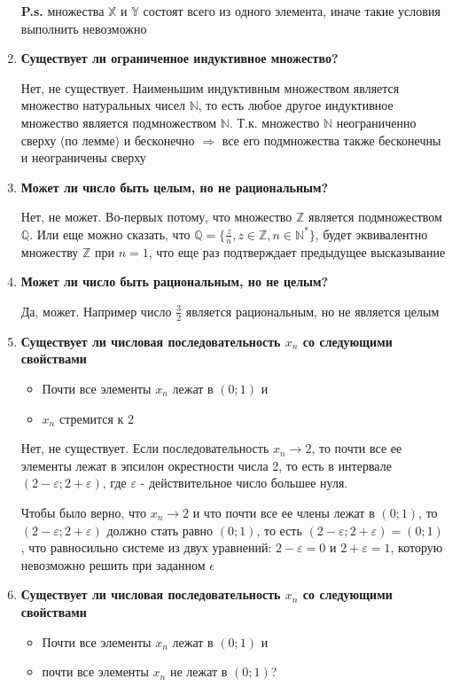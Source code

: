 \documentclass[a4paper,12pt]{article}
\begin{document}
\begin{enumerate}
{        \textbf{P.s.} множества $\mathbb{X}$ и $\mathbb{Y}$ состоят всего из одного элемента, иначе такие
        условия выполнить невозможно
    }
    \item {
      \textbf{Существует ли ограниченное индуктивное множество?}

      Нет, не существует. Наименьшим индуктивным множеством является множество натуральных чисел $\mathbb{N}$,
      то есть любое другое индуктивное множество является подмножеством $\mathbb{N}$. Т.к. множество $\mathbb{N}$
      неограниченно сверху (по лемме) и бесконечно $\Rightarrow$ все его подмножества также бесконечны и неограничены сверху
    }
    \item {
      \textbf{Может ли число быть целым, но не рациональным?}

      Нет, не может. Во-первых потому, что множество $\mathbb{Z}$ является подмножеством $\mathbb{Q}$.
      Или еще можно сказать, что $\mathbb{Q} = \{\frac{z}{n}, z \in \mathbb{Z}, n \in \mathbb{N}^{*}\}$,
      будет эквивалентно множеству $\mathbb{Z}$ при $n = 1$, что еще раз подтверждает предыдущее высказывание
    }
    \item {
      \textbf{Может ли число быть рациональным, но не целым?}

      Да, может. Например число $\frac{3}{2}$ является рациональным, но не является целым
    }
    \item {
      \textbf{Существует ли числовая последовательность $x_n$ со следующими свойствами}
      \begin{itemize}
        \item Почти все элементы $x_n$ лежат  в $(0; 1)$ и
        \item $x_n$ стремится к 2
      \end{itemize}

      Нет, не существует. Если последовательность $x_n \rightarrow 2$, то почти все ее элементы лежат
      в эпсилон окрестности числа 2, то есть в интервале $(2 - \varepsilon; 2 + \varepsilon)$, где
      $\varepsilon$ - действительное число большее нуля.
      
      Чтобы было верно, что $x_n \rightarrow 2$ и что почти все ее члены лежат в $(0; 1)$, то 
      $(2 - \varepsilon; 2 + \varepsilon)$ должно стать равно $(0; 1)$, то есть
      $(2 - \varepsilon; 2 + \varepsilon) = (0; 1)$, что равносильно системе из двух уравнений:
      $2 - \varepsilon = 0$ и $2 + \varepsilon = 1$, которую невозможно решить при заданном $\epsilon$
    }
    \item {
      \textbf{Существует ли числовая последовательность $x_n$ со следующими свойствами}
      \begin{itemize}
        \item Почти все элементы $x_n$ лежат в $(0; 1)$ и
        \item почти все элементы $x_n$ не лежат в $(0; 1)$?
      \end{itemize}

}
\end{enumerate}
\end{document}

